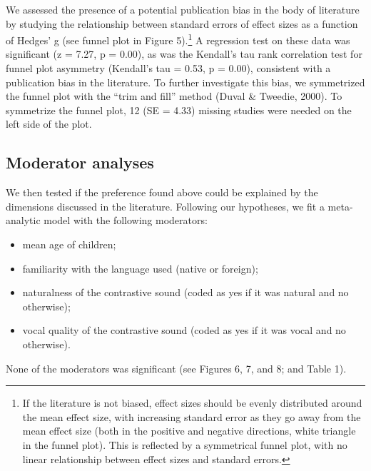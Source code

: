 \documentclass[man]{apa6}
\providecommand{\tightlist}{%
  \setlength{\itemsep}{0pt}\setlength{\parskip}{0pt}}
\let\rmarkdownfootnote\footnote%
\def\footnote{\protect\rmarkdownfootnote}
\begin{document}
We assessed the presence of a potential publication bias in the body of
literature by studying the relationship between standard errors of
effect sizes as a function of Hedges' g (see funnel plot in Figure
5).\footnote{If the literature is not biased, effect sizes should be
  evenly distributed around the mean effect size, with increasing
  standard error as they go away from the mean effect size (both in the
  positive and negative directions, white triangle in the funnel plot).
  This is reflected by a symmetrical funnel plot, with no linear
  relationship between effect sizes and standard errors.} A regression
test on these data was significant (z = 7.27, p = 0.00), as was the
Kendall's tau rank correlation test for funnel plot asymmetry (Kendall's
tau = 0.53, p = 0.00), consistent with a publication bias in the
literature. To further investigate this bias, we symmetrized the funnel
plot with the \enquote{trim and fill} method (Duval \& Tweedie, 2000).
To symmetrize the funnel plot, 12 (SE = 4.33) missing studies were
needed on the left side of the plot.

\subsection{Moderator analyses}\label{moderator-analyses}

We then tested if the preference found above could be explained by the
dimensions discussed in the literature. Following our hypotheses, we fit
a meta-analytic model with the following moderators:

\begin{itemize}
\tightlist
\item
  mean age of children;
\item
  familiarity with the language used (native or foreign);
\item
  naturalness of the contrastive sound (coded as yes if it was natural
  and no otherwise);
\item
  vocal quality of the contrastive sound (coded as yes if it was vocal
  and no otherwise).
\end{itemize}

None of the moderators was significant (see Figures 6, 7, and 8; and
Table 1).
\end{document}

